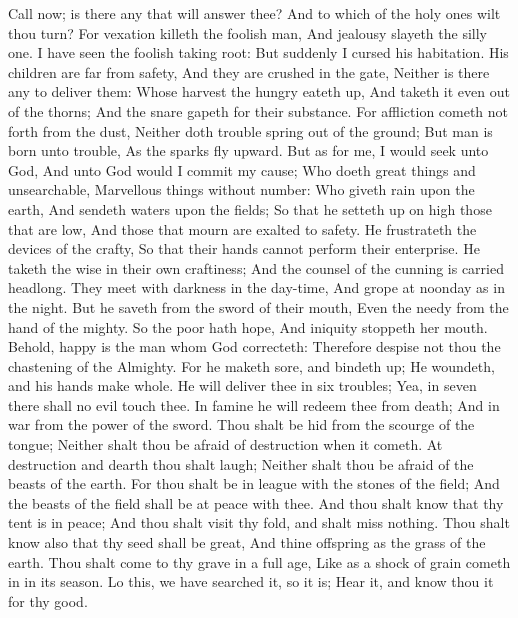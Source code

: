 Call now; is there any that will answer thee? And to which of the holy ones wilt thou turn?  For vexation killeth the foolish man, And jealousy slayeth the silly one.  I have seen the foolish taking root: But suddenly I cursed his habitation.  His children are far from safety, And they are crushed in the gate, Neither is there any to deliver them:  Whose harvest the hungry eateth up, And taketh it even out of the thorns; And the snare gapeth for their substance.  For affliction cometh not forth from the dust, Neither doth trouble spring out of the ground;  But man is born unto trouble, As the sparks fly upward.  But as for me, I would seek unto God, And unto God would I commit my cause;  Who doeth great things and unsearchable, Marvellous things without number:  Who giveth rain upon the earth, And sendeth waters upon the fields;  So that he setteth up on high those that are low, And those that mourn are exalted to safety.  He frustrateth the devices of the crafty, So that their hands cannot perform their enterprise.  He taketh the wise in their own craftiness; And the counsel of the cunning is carried headlong.  They meet with darkness in the day-time, And grope at noonday as in the night.  But he saveth from the sword of their mouth, Even the needy from the hand of the mighty.  So the poor hath hope, And iniquity stoppeth her mouth.  Behold, happy is the man whom God correcteth: Therefore despise not thou the chastening of the Almighty.  For he maketh sore, and bindeth up; He woundeth, and his hands make whole.  He will deliver thee in six troubles; Yea, in seven there shall no evil touch thee.  In famine he will redeem thee from death; And in war from the power of the sword.  Thou shalt be hid from the scourge of the tongue; Neither shalt thou be afraid of destruction when it cometh.  At destruction and dearth thou shalt laugh; Neither shalt thou be afraid of the beasts of the earth.  For thou shalt be in league with the stones of the field; And the beasts of the field shall be at peace with thee.  And thou shalt know that thy tent is in peace; And thou shalt visit thy fold, and shalt miss nothing.  Thou shalt know also that thy seed shall be great, And thine offspring as the grass of the earth.  Thou shalt come to thy grave in a full age, Like as a shock of grain cometh in in its season.  Lo this, we have searched it, so it is; Hear it, and know thou it for thy good. 

